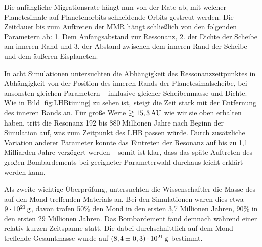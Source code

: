 \documentclass[12pt,a4paper,twoside]{article}
\renewcommand{\cite}{\citep}
\begin{document}
Die anfängliche Migrationsrate hängt nun von der Rate ab, mit welcher Planetesimale auf Planetenorbits schneidende Orbits gestreut werden. Die Zeitdauer bis zum Auftreten der MMR hängt schließlich von den folgenden Parametern ab:
1. Dem Anfangsabstand zur Ressonanz, 2. der Dichte der Scheibe am inneren Rand und 3. der Abstand zwischen dem inneren Rand der Scheibe und dem äußeren Eisplaneten\cite{Gomes2005}.

In acht Simulationen untersuchten \cite{Gomes2005} die Abhängigkeit des Ressonanzzeitpunktes in Abhängigkeit von der Position des inneren Rands der Planetesimalscheibe, bei ansonsten gleichen Parametern – inklusive gleicher Scheibenmasse und Dichte. Wie in Bild \ref{fig:LHBtiming} zu sehen ist, steigt die Zeit stark mit der Entfernung des inneren Rands an. Für große Werte $\gtrsim \unit[15,3]{AU}$ wie wir sie oben erhalten haben, tritt die Resonanz 192 bis 880 Millionen Jahre nach Beginn der Simulation auf, was zum Zeitpunkt des LHB passen würde. %
Durch zusätzliche Variation anderer Parameter konnte das Eintreten der Resonanz auf bis zu 1,1 Milliarden Jahre\cite{Gomes2005} verzögert werden – somit ist klar, dass das späte Auftreten des großen Bombardements bei geeigneter Parameterwahl durchaus leicht erklärt werden kann.

Als zweite wichtige Überprüfung, untersuchten die Wissenschaftler die Masse des auf den Mond treffenden Materials an. Bei den Simulationen waren dies etwa $\unit[9 \cdot 10^{21}]{g}$, davon trafen 50\% den Mond in den ersten 3,7 Millionen Jahren, 90\% in den ersten 29 Millionen Jahren. Das Bombardement fand demnach während einer relativ kurzen Zeitspanne statt. Die dabei durchschnittlich auf dem Mond treffende Gesamtmasse wurde auf $\unit[\left(8,4 \pm 0,3\right) \cdot 10^{21}]{g}$ bestimmt\cite{Gomes2005}.
\end{document}
